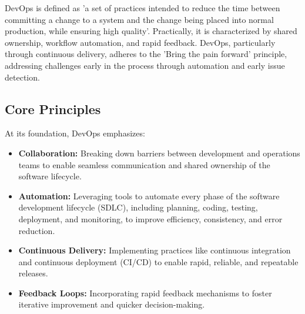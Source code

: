 \documentclass[12pt]{book}
\begin{document}
DevOps is defined as 'a set of practices intended to reduce the time between committing a change to a system and the change being placed into normal production, while ensuring high quality'. Practically, it is characterized by shared ownership, workflow automation, and rapid feedback. 
DevOps, particularly through continuous delivery, adheres to the 'Bring the pain forward' principle, addressing challenges early in the process through automation and early issue detection.

\subsection{Core Principles}

At its foundation, DevOps emphasizes:
\begin{itemize}
    \item \textbf{Collaboration:} Breaking down barriers between development and operations teams to enable seamless communication and shared ownership of the software lifecycle.
    \item \textbf{Automation:} Leveraging tools to automate every phase of the software development lifecycle (SDLC), including planning, coding, testing, deployment, and monitoring, to improve efficiency, consistency, and error reduction.
    \item \textbf{Continuous Delivery:} Implementing practices like continuous integration and continuous deployment (CI/CD) to enable rapid, reliable, and repeatable releases.
    \item \textbf{Feedback Loops:} Incorporating rapid feedback mechanisms to foster iterative improvement and quicker decision-making.
\end{itemize}
\end{document}
